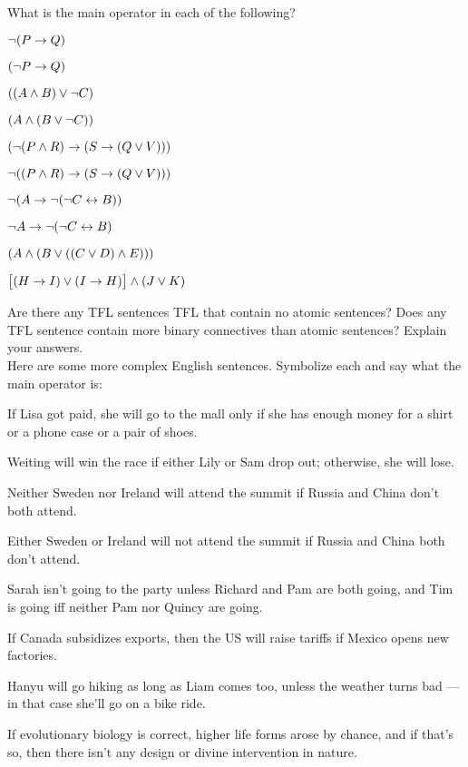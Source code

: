 \problempart
What is the main operator in each of the following?  

\begin{earg}
\item $\neg (P \rightarrow Q)$
\item $(\neg P \rightarrow Q)$
\item $((A \wedge B) \vee \neg C)$
\item $(A \wedge (B \vee \neg C))$
\item $(\neg (P \wedge R) \rightarrow (S \rightarrow (Q \vee V)))$
\item$\neg ((P \wedge R) \rightarrow (S \rightarrow (Q \vee V)))$
\item $\neg(A \rightarrow \neg (\neg C \leftrightarrow B))$
\item $\neg A \rightarrow \neg (\neg C \leftrightarrow B)$
\item $(A \wedge (B \vee ((C \vee D) \wedge E)))$
\item $\bigl[(H \rightarrow I) \vee (I \rightarrow H)\bigr] \wedge (J \vee K)$
\end{earg}

\problempart
Are there any TFL sentences TFL that contain no atomic sentences? Does any TFL sentence contain more binary connectives than atomic sentences?  Explain your answers.\\

\problempart
Here are some more complex English sentences.   Symbolize each and say what the main operator is:


\begin{earg}

\item If Lisa got paid, she will go to the mall only if she has enough money for a shirt or a phone case or a pair of shoes.

\item Weiting will win the race if either Lily or Sam drop out; otherwise, she will lose.



\item Neither Sweden nor Ireland will attend the summit if Russia and China don't both attend.

\item Either Sweden or Ireland will not attend the summit if Russia and China both don't attend.

\item Sarah isn't going to the party unless Richard and Pam are both going, and Tim is
going iff neither Pam nor Quincy are going.

\item If Canada subsidizes exports, then the US will raise tariffs if Mexico opens new factories.


\item Hanyu will go hiking as long as Liam comes too, unless the weather turns bad --- in that case she'll go on a bike ride.

\item   If evolutionary biology is correct, higher life forms arose by  chance, and if that's so, then there isn't any design or divine intervention in nature.


\end{earg}